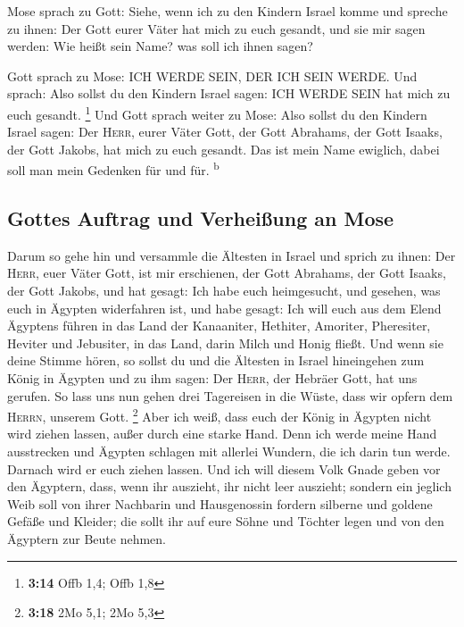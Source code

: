 Mose sprach zu Gott: Siehe, wenn ich zu den Kindern
Israel komme und spreche zu ihnen: Der Gott eurer Väter hat mich zu euch
gesandt, und sie mir sagen werden: Wie heißt sein Name? was soll ich
ihnen sagen?

 Gott sprach zu Mose: ICH WERDE SEIN, DER ICH SEIN WERDE.
Und sprach: Also sollst du den Kindern Israel sagen: ICH WERDE SEIN hat
mich zu euch gesandt. \footnote{\textbf{3:14} Offb 1,4; Offb 1,8}
 Und Gott sprach weiter zu Mose: Also sollst du den
Kindern Israel sagen: Der \textsc{Herr}, eurer Väter Gott, der Gott
Abrahams, der Gott Isaaks, der Gott Jakobs, hat mich zu euch gesandt.
Das ist mein Name ewiglich, dabei soll man mein Gedenken für und für.
\textsuperscript{b}

\hypertarget{gottes-auftrag-und-verheiuxdfung-an-mose}{%
\subsection{Gottes Auftrag und Verheißung an
Mose}\label{gottes-auftrag-und-verheiuxdfung-an-mose}}

 Darum so gehe hin und versammle die Ältesten in Israel
und sprich zu ihnen: Der \textsc{Herr}, euer Väter Gott, ist mir
erschienen, der Gott Abrahams, der Gott Isaaks, der Gott Jakobs, und hat
gesagt: Ich habe euch heimgesucht, und gesehen, was euch in Ägypten
widerfahren ist,  und habe gesagt: Ich will euch aus dem
Elend Ägyptens führen in das Land der Kanaaniter, Hethiter, Amoriter,
Pheresiter, Heviter und Jebusiter, in das Land, darin Milch und Honig
fließt.  Und wenn sie deine Stimme hören, so sollst du
und die Ältesten in Israel hineingehen zum König in Ägypten und zu ihm
sagen: Der \textsc{Herr}, der Hebräer Gott, hat uns gerufen. So lass uns
nun gehen drei Tagereisen in die Wüste, dass wir opfern dem
\textsc{Herrn}, unserem Gott. \footnote{\textbf{3:18} 2Mo 5,1; 2Mo 5,3}
 Aber ich weiß, dass euch der König in Ägypten nicht wird
ziehen lassen, außer durch eine starke Hand.  Denn ich
werde meine Hand ausstrecken und Ägypten schlagen mit allerlei Wundern,
die ich darin tun werde. Darnach wird er euch ziehen lassen.
 Und ich will diesem Volk Gnade geben vor den Ägyptern,
dass, wenn ihr auszieht, ihr nicht leer auszieht; 
sondern ein jeglich Weib soll von ihrer Nachbarin und Hausgenossin
fordern silberne und goldene Gefäße und Kleider; die sollt ihr auf eure
Söhne und Töchter legen und von den Ägyptern zur Beute nehmen.

